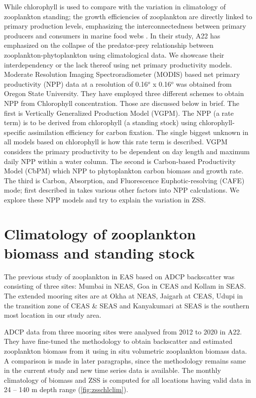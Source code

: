\documentclass{article}
\begin{document}
	While chlorophyll is used to compare with the variation in climatology of zooplankton standing; the growth efficiencies of zooplankton are directly linked to primary production levels, emphasizing the interconnectedness between primary producers and consumers in marine food webs \citep{friedland2012pathways}. In their study, A22 has emphasized on the collapse of the predator-prey relationship between zooplankton-phytoplankton using climatological data. We showcase their interdependency or the lack thereof using net primary productivity models.
	Moderate Resolution Imaging Spectroradiometer (MODIS) based net primary productivity (NPP) data at a resolution of 0.16$^o$ x 0.16$^o$ was obtained from Oregon State University. They have employed three different schemes to obtain NPP from Chlorophyll concentration. Those are discussed below in brief. The first is Vertically Generalized Production Model (VGPM). The NPP (a rate term) is to be derived from chlorophyll (a standing stock) using chlorophyll-specific assimilation efficiency for carbon fixation. The single biggest unknown in all models based on chlorophyll is how this rate term is described. VGPM considers the primary productivity to be dependent on day length and maximum daily NPP within a water column. The second is Carbon-based Productivity Model (CbPM) which NPP to phytoplankton carbon biomass and growth rate. The third is Carbon, Absorption, and Fluorescence Euphotic-resolving (CAFE) mode; first described in \citet{silsbe2016cafe} takes various other factors into NPP calculations. We explore these NPP models and try to explain the variation in ZSS.
	 
	\section{Climatology of zooplankton biomass and standing stock}
	The previous study of zooplankton in EAS based on ADCP backscatter was consisting of three sites: Mumbai in NEAS, Goa in CEAS and Kollam in SEAS. The extended mooring sites are at Okha at NEAS, Jaigarh at CEAS, Udupi in the transition zone of CEAS \& SEAS and Kanyakumari at SEAS is the southern most location in our study area. 

	ADCP data from three mooring sites were analysed from 2012 to 2020 in A22. They have fine-tuned the methodology to obtain backscatter and estimated zooplankton biomass from it using in situ volumetric zooplankton biomass data. A comparison is made in later paragraphs, since the methodology remains same in the current study and new time series data is available. The monthly climatology of biomass and ZSS is computed for all locations having valid data in 24 -- 140 m depth range (\cref{fig:zsschlclim}).
	 
\end{document}
